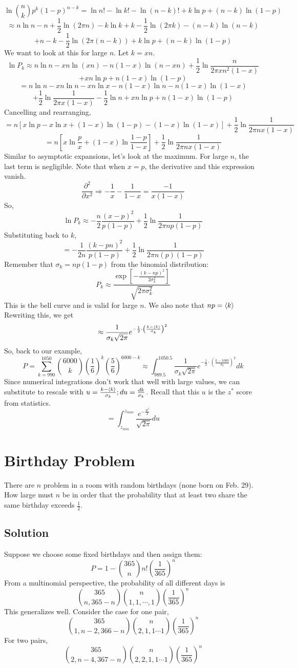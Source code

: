 \documentclass[../main.tex]{subfiles}
\begin{document}
$$\ln {n\choose k}p^{k}(1-p)^{n-k}=\ln n! - \ln k! - \ln (n-k)! + k\ln p + (n-k)\ln (1-p)$$
$$\approx n\ln n - n+ \frac{1}{2}\ln (2\pi n)-k\ln k+k-\frac{1}{2}\ln(2\pi k)-(n-k)\ln(n-k)$$
$$+n-k-\frac{1}{2}\ln(2\pi (n-k))+k\ln p + (n-k)\ln (1-p)$$
We want to look at this for large $n$. Let $k=xn$.
$$\ln P_{k}\approx n\ln n - xn\ln(xn)-n(1-x)\ln(n-xn)+\frac{1}{2}\ln \frac{n}{2\pi xn^{2}(1-x)}$$
$$+xn\ln p + n(1-x)\ln(1-p)$$
$$=n\ln n - xn\ln n - xn\ln x - n(1-x)\ln n - n(1-x)\ln(1-x)$$
$$+\frac{1}{2}\ln\frac{1}{2\pi x(1-x)}-\frac{1}{2}\ln n+xn\ln p+n(1-x)\ln(1-p)$$
Cancelling and rearranging,
$$=n\left[x\ln p -x\ln x+(1-x)\ln(1-p)-(1-x)\ln (1-x)\right]+\frac{1}{2}\ln\frac{1}{2\pi n x(1-x)}$$
$$=n\left[x\ln\frac{p}{x}+(1-x)\ln \frac{1-p}{1-x}\right]+\frac{1}{2}\ln\frac{1}{2\pi n x(1-x)}$$
Similar to asymptotic expansions, let's look at the maximum. For large $n$, the last term is negligible.
Note that when $x=p$, the derivative and this expression vanish. 
$$\frac{\partial^{2}}{\partial x^{2}}\Rightarrow -\frac{1}{x}-\frac{1}{1-x}=\frac{-1}{x(1-x)}$$
So,
$$\ln P_{k}\approx -\frac{n}{2}\frac{(x-p)^{2}}{p(1-p)}+\frac{1}{2}\ln\frac{1}{2\pi n p(1-p)}$$
Substituting back to $k$,
$$=-\frac{1}{2n}\frac{(k-pn)^{2}}{p(1-p)}+\frac{1}{2}\ln\frac{1}{2\pi n (p)(1-p)}$$
Remember that $\sigma_{k}=np(1-p)$ from the binomial distribution:
$$P_{k}\approx \frac{\exp\left[-\frac{(k-np)^{2}}{2\sigma_{k}^{2}}\right]}{\sqrt{2\pi \sigma_{k}^{2}}}$$
This is the bell curve and is valid for large $n$. We also note that $np={\langle k \rangle}$
Rewriting this, we get
$$\approx \frac{1}{\sigma_{k}\sqrt{2\pi}}e^{-\frac{1}{2}\cdot \left(\frac{k-{\langle k \rangle}}{\sigma_{k}}\right)^{2}}$$
So, back to our example,
$$P=\sum_{k=990}^{1050}{6000 \choose k}\left(\frac{1}{6}\right)^{k}\left(\frac{5}{6}\right)^{6000-k}
\approx\int_{989.5}^{1050.5}\frac{1}{\sigma_{k}\sqrt{2\pi}}e^{-\frac{1}{2}\cdot \left(\frac{k-1000}{\sigma_{k}}\right)^{2}}dk$$
Since numerical integrations don't work that well with large values, we can substitute to rescale with $u=\frac{k-{\langle k \rangle}}{\sigma_{k}};du=\frac{dk}{\sigma_{k}}$.
Recall that this $u$ is the $z^{*}$ score from statistics.
$$=\int_{z_{min}}^{z_{max}}\frac{e^{-\frac{u^{2}}{2}}}{\sqrt{2\pi}}du$$

\section{Birthday Problem}
There are $n$ problem in a room with random birthdays (none born on Feb. 29). How large must $n$ be
in order that the probability that at least two share the same birthday exceeds $\frac{1}{2}$.

\subsection{Solution}
Suppose we choose some fixed birthdays and then assign them:
$$P=1-{365\choose n}n!\left(\frac{1}{365}\right)^{n}$$
From a multinomial perspective, the probability of all different days is
$${365\choose n,365-n}{n\choose 1,1,\cdots,1}\left(\frac{1}{365}\right)^{n}$$
This generalizes well. Consider the case for one pair,
$${365 \choose 1,n-2,366-n}{n\choose 2,1,1\cdots 1}\left(\frac{1}{365}\right)^{n}$$
For two pairs,
$${365\choose 2,n-4, 367-n}{n\choose 2,2,1,1\cdots 1}\left(\frac{1}{365}\right)^{n}$$
\end{document}
